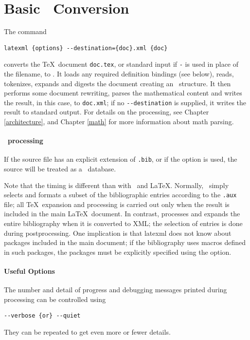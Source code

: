 \documentclass{book}
\newcommand{\shellcode}{\lstinline[style=shell]}
\begin{document}
\section[Conversion]{Basic \XML\ Conversion}\label{usage.conversion}
The command
\begin{lstlisting}[style=shell]
latexml {options} --destination={doc}.xml {doc}
\end{lstlisting}
converts the \TeX\ document \texttt{doc.tex},
or standard input if \texttt{-} is used in place of the filename, to \XML.
It loads any required definition bindings (see below),
reads, tokenizes, expands and digests the document creating an \XML\ structure.
It then performs some document rewriting, parses the mathematical content
and writes the result, in this case, to \texttt{doc.xml};
if no \shellcode|--destination| is supplied, it writes the result to standard output.
For details on the processing, see Chapter \ref{architecture},
and Chapter \ref{math} for more information about math parsing.

\paragraph{\BibTeX\ processing}
If the source file has an explicit extension of \texttt{.bib},
or if the  option is used, the source will be
treated as a \BibTeX\ database.

Note that the timing is different than with \BibTeX\ and \LaTeX.
Normally, \BibTeX\ simply selects and formats a subset of the
bibliographic entries according to the \texttt{.aux} file;
all \TeX\ expansion and processing is carried out only when
the result is included in the main \LaTeX\ document.
In contrast,  processes and expands
the entire bibliography when it is converted to XML;
the selection of entries is done during postprocessing.
One implication is that latexml does not know about packages
included in the main document; if the bibliography uses
macros defined in such packages, the packages must be explicitly
specified using the  option.

\paragraph{Useful Options}
The number and detail of progress and debugging messages printed
during processing can be controlled using
\begin{lstlisting}[style=shell]
--verbose {or} --quiet
\end{lstlisting}
They can  be repeated to get even more or fewer details.
\end{document}
